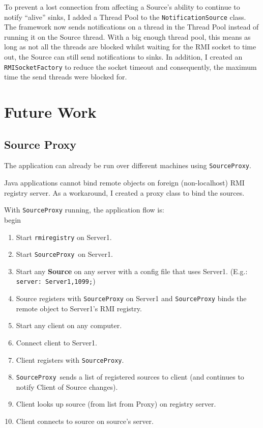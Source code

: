 \documentclass[a4paper]{article}
\begin{document}
To prevent a lost connection from affecting a Source's ability to continue to notify ``alive'' sinks, I added a Thread Pool to the \texttt{NotificationSource} class.
The framework now sends notifications on a thread in the Thread Pool instead of running it on the Source thread.
With a big enough thread pool, this means as long as not all the threads are blocked whilst waiting for the RMI socket to time out, the Source can still send notifications to sinks.
In addition, I created an \texttt{RMISocketFactory} to reduce the socket timeout and consequently, the maximum time the send threads were blocked for.

\section{Future Work}
\subsection{Source Proxy}\label{sec:source_proxy}
The application can already be run over different machines using \texttt{SourceProxy}.

Java applications cannot bind remote objects on foreign (non-localhost) RMI registry server.
As a workaround, I created a proxy class to bind the sources.

With \texttt{SourceProxy} running, the application flow is:
\\begin{\begin{enumerate}
  \item Start \texttt{rmiregistry} on Server1.
  \item Start \texttt{SourceProxy} on Server1.
  \item Start any \textbf{Source} on any server with a config file that uses Server1. (E.g.: \texttt{server: Server1,1099;})
  \item Source registers with \texttt{SourceProxy} on Server1 and \texttt{SourceProxy} binds the remote object to Server1's RMI registry.
  \item Start any client on any computer.
  \item Connect client to Server1.
  \item Client registers with \texttt{SourceProxy}.
  \item \texttt{SourceProxy} sends a list of registered sources to client (and continues to notify Client of Source changes).
  \item Client looks up source (from list from Proxy) on registry server.
  \item Client connects to source on source's server.
\end{enumerate}}
\end{document}
